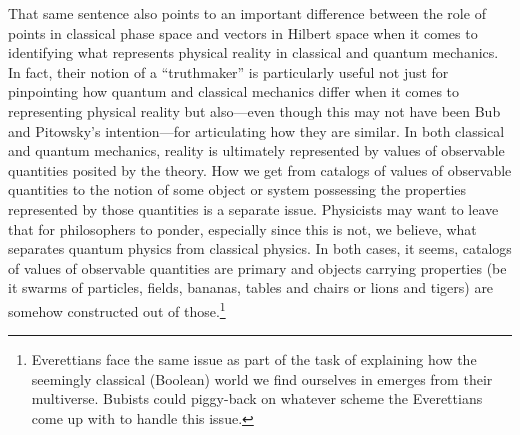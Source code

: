 That same sentence also points to an important difference between the role of points in classical phase space and vectors in Hilbert space when it comes to identifying what represents physical reality in classical and quantum mechanics. In fact, their notion of a ``truthmaker'' is particularly useful not just for pinpointing how quantum and classical mechanics differ when it comes to representing physical reality but also---even though this may not have been Bub and Pitowsky's intention---for articulating how they are similar. In both classical and quantum mechanics, reality is ultimately represented by values of observable quantities posited by the theory. How we get from catalogs of values of observable quantities to the notion of some object or system possessing the properties represented by those quantities is a separate issue. Physicists may want to leave that for philosophers to ponder, especially since this is not, we believe, what separates quantum physics from classical physics. In both cases, it seems, catalogs of values of observable quantities are primary and objects carrying properties (be it swarms of particles, fields, bananas, tables and chairs or lions and tigers) are somehow constructed out of those.\footnote{Everettians face the same issue as part of the task of explaining how the seemingly classical (Boolean) world we find ourselves in emerges from their multiverse. Bubists could piggy-back on whatever scheme the Everettians come up with to handle this issue.}  

